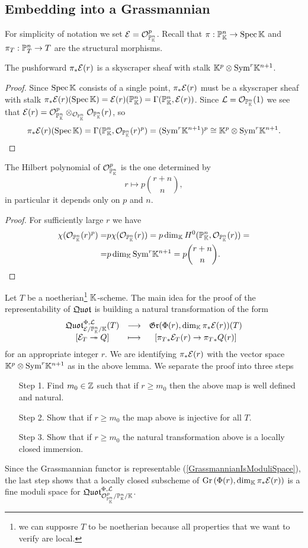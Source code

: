 \subsection{Embedding into a Grassmannian}
For simplicity of notation we set $\mathcal{E}=\mathcal{O}^p_{\mathbb{P}^n_{\mathbb{K}}}$. Recall that $\pi:\mathbb{P}^n_{\mathbb{K}}\to \mathrm{Spec}\, \mathbb{K}$ and $\pi_T:\mathbb{P}^n_T\to T$ are the structural morphisms.
\begin{lemma}\label{PushforwardEr}
The pushforward
$\pi_\ast\mathcal{E}(r)$ is a skyscraper sheaf with stalk $\mathbb{K}^p\otimes \mathrm{Sym}^r\mathbb{K}^{n+1}$.
\end{lemma}
\begin{proof}
Since $\mathrm{Spec}\,\mathbb{K}$ consists of a single point, $\pi_\ast\mathcal{E}(r)$ must be a skyscraper sheaf with stalk $\pi_\ast\mathcal{E}(r)(\mathrm{Spec}\,\mathbb{K})=\mathcal{E}(r)(\mathbb{P}^n_{\mathbb{K}})=\Gamma(\mathbb{P}^n_{\mathbb{K}},\mathcal{E}(r))$. Since $\mathcal{L}=\mathcal{O}_{\mathbb{P}^n_{\mathbb{K}}}(1)$ we see that $\mathcal{E}(r)=\mathcal{O}_{\mathbb{P}^n_{\mathbb{K}}}^p\otimes_{\mathcal{O}_{\mathbb{P}^n_{\mathbb{K}}}}\mathcal{O}_{\mathbb{P}^n_{\mathbb{K}}}(r)$, so
\[\pi_\ast\mathcal{E}(r)(\mathrm{Spec}\,\mathbb{K})=\Gamma(\mathbb{P}^n_{\mathbb{K}},\mathcal{O}_{\mathbb{P}^n_{\mathbb{K}}}(r)^p)=(\mathrm{Sym}^r\mathbb{K}^{n+1})^p\cong \mathbb{K}^p\otimes\mathrm{Sym}^r\mathbb{K}^{n+1}.\]
\end{proof}

\begin{lemma}\label{HilbetPolynomialOfProjectiveSpace}
The Hilbert polynomial of $\mathcal{O}_{\mathbb{P}^n_{\mathbb{K}}}^p$ is the one determined by
\[r\mapsto p\binom{r+n}n,\]
in particular it depends only on $p$ and $n$.
\end{lemma}
\begin{proof}
For sufficiently large $r$ we have
\begin{align*}
\chi(\mathcal{O}_{\mathbb{P}^n_{\mathbb{K}}}(r)^p)=&p\chi(\mathcal{O}_{\mathbb{P}^n_{\mathbb{K}}}(r))=p\dim_{\mathbb{K}} H^0(\mathbb{P}^n_{\mathbb{K}},\mathcal{O}_{\mathbb{P}^n_{\mathbb{K}}}(r))=\\
=&p\dim_{\mathbb{K}} \mathrm{Sym}^r \mathbb{K}^{n+1}=p\binom{r+n}n.
\end{align*}
\end{proof}


Let $T$ be a noetherian\footnote{we can supposre $T$ to be noetherian because all properties that we want to verify are local.} $\mathbb{K}$-scheme. The main idea for the proof of the representability of $\mathfrak{Quot}$ is building a natural transformation of the form
\[\begin{array}{ccc} {\mathfrak{Quot}^{\Phi,\mathcal{L}}_{\mathcal{E}/\mathbb{P}^n_{\mathbb{K}}/\mathbb{K}}(T)} & \longrightarrow & {\mathfrak{Gr}(\Phi(r),\dim_{\mathbb{K}}\pi_\ast\mathcal{E}(r))(T)}\\ {[\mathcal{E}_T\twoheadrightarrow Q]} & \longmapsto & {[{\pi_T}_\ast\mathcal{E}_T(r)\to {\pi_T}_\ast Q(r)]} \end{array}\]
for an appropriate integer $r$. We are identifying $\pi_\ast\mathcal{E}(r)$ with the vector space $\mathbb{K}^p\otimes\mathrm{Sym}^r\mathbb{K}^{n+1}$ as in the above lemma. We separate the proof into three steps
\setlength{\leftmargini}{0cm}
\begin{enumerate}
\item[Step 1.] Find $m_0\in\mathbb{Z}$ such that if $r\geq m_0$ then the above map is well defined and natural.
\item[Step 2.] Show that if $r\geq m_0$ the map above is injective for all $T$.
\item[Step 3.] Show that if $r\geq m_0$ the natural transformation above is a locally closed immersion.
\end{enumerate}
\setlength{\leftmargini}{0.5cm}
Since the Grassmannian functor is representable (\ref{GrassmannianIsModuliSpace}), the last step shows that a locally closed subscheme of $\mathrm{Gr}\left({\Phi(r), \dim_{\mathbb{K}}\pi_\ast\mathcal{E}(r)}\right)$ is a fine moduli space for $\mathfrak{Quot}^{\Phi,\mathcal{L}}_{\mathcal{O}^p_{\mathbb{P}^n_{\mathbb{K}}}/\mathbb{P}^n_{\mathbb{K}}/\mathbb{K}}$.


